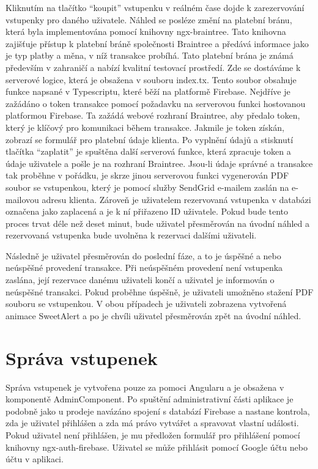 Kliknutím na tlačítko “koupit” vstupenku v reálném čase dojde k zarezervování vstupenky pro daného uživatele. Náhled se posléze změní na platební bránu, která byla implementována pomocí knihovny ngx-braintree. Tato knihovna zajišťuje přístup k platební bráně společnosti Braintree a předává informace jako je typ platby a měna, v níž transakce probíhá. Tato platební brána je známá především v zahraničí a nabízí kvalitní testovací prostředí. Zde se dostáváme k serverové logice, která je obsažena v souboru index.tx. Tento soubor obsahuje funkce napsané v Typescriptu, které běží na platformě Firebase. Nejdříve je zažádáno o token transakce pomocí požadavku na serverovou funkci hostovanou platformou Firebase. Ta zažádá webové rozhraní Braintree, aby předalo token, který je klíčový pro komunikaci během transakce. Jakmile je token získán, zobrazí se formulář pro platební údaje klienta. Po vyplnění údajů a stisknutí tlačítka “zaplatit” je spuštěna další serverová funkce, která zpracuje token a údaje uživatele a pošle je na rozhraní Braintree. Jsou-li údaje správné a transakce tak proběhne v pořádku, je skrze jinou serverovou funkci vygenerován PDF soubor se vstupenkou, který je pomocí služby SendGrid e-mailem zaslán na e-mailovou adresu klienta. Zároveň je uživatelem rezervovaná vstupenka v databázi označena jako zaplacená a je k ní přiřazeno ID uživatele. Pokud bude tento proces trvat déle než deset minut, bude uživatel přesměrován na úvodní náhled a rezervovaná vstupenka bude uvolněna k rezervaci dalšími uživateli.

Následně je uživatel přesměrován do poslední fáze, a to je úspěšné a nebo neúspěšné provedení transakce. Při neúspěšném provedení není vstupenka zaslána, její rezervace danému uživateli končí a uživatel je informován o neúspěšné transakci. Pokud proběhne úspěšně, je uživateli umožněno stažení PDF souboru se vstupenkou. V obou případech je uživateli zobrazena vytvořená animace SweetAlert a po je chvíli uživatel přesměrován zpět na úvodní náhled.

	\section{Správa vstupenek}
Správa vstupenek je vytvořena pouze za pomoci Angularu a je obsažena v komponentě AdminComponent. Po spuštění administrativní části aplikace je podobně jako u prodeje navázáno spojení s databází Firebase a nastane kontrola, zda je uživatel přihlášen a zda má právo vytvářet a spravovat vlastní události. Pokud uživatel není přihlášen, je mu předložen formulář pro přihlášení pomocí knihovny ngx-auth-firebase. Uživatel se může přihlásit pomocí Google účtu nebo účtu v aplikaci.

